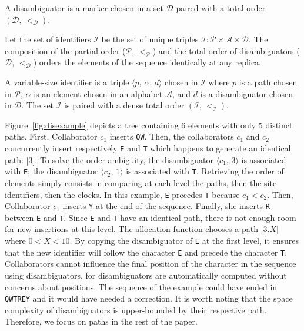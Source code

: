 \begin{definition}[Disambiguator]
  A disambiguator is a marker chosen in a set $\mathcal{D}$ paired with a total
  order $(\mathcal{D},\, <_\mathcal{D})$.
\end{definition}

Let the set of identifiers $\mathcal{I}$ be the set of unique triples
$\mathcal{I}:\mathcal{P}\times \mathcal{A}\times \mathcal{D}$. The composition
of the partial order ($\mathcal{P}$, $<_{\mathcal{P}}$) and the total order of
disambiguators ($\mathcal{D}$, $<_{\mathcal{D}}$) orders the elements of the
sequence identically at any replica.

\begin{definition}
  A variable-size identifier is a triple $\langle p,\, \alpha,\, d \rangle$
  chosen in $\mathcal{I}$ where $p$ is a path chosen in $\mathcal{P}$, $\alpha$
  is an element chosen in an alphabet $\mathcal{A}$, and $d$ is a disambiguator
  chosen in $\mathcal{D}$. The set $\mathcal{I}$ is paired with a dense total
  order $(\mathcal{I},\,<_\mathcal{I})$.
\end{definition}

Figure~\ref{fig:disexample} depicts a tree containing 6 elements with only 5
distinct paths. First, Collaborator $c_1$ inserts \texttt{QW}.  Then, the
collaborators $c_1$ and $c_2$ concurrently insert respectively \texttt{E} and
\texttt{T} which happens to generate an identical path: [$3$]. To solve the
order ambiguity, the disambiguator $\langle c_1,\, 3\rangle$ is associated with
\texttt{E}; the disambiguator $\langle c_2,\, 1\rangle$ is associated with
\texttt{T}. Retrieving the order of elements simply consists in comparing at
each level the paths, then the site identifiers, then the clocks. In this
example, \texttt{E} precedes \texttt{T} because $c_1 < c_2$. Then, Collaborator
$c_1$ inserts \texttt{Y} at the end of the sequence. Finally, she inserts
\texttt{R} between \texttt{E} and \texttt{T}. Since \texttt{E} and \texttt{T}
have an identical path, there is not enough room for new insertions at this
level. The allocation function chooses a path [$3.X$] where $0<X<10$. By copying
the disambiguator of \texttt{E} at the first level, it ensures that the new
identifier will follow the character \texttt{E} and precede the character
\texttt{T}.  Collaborators cannot influence the final position of the character
in the sequence using disambiguators, for disambiguators are automatically
computed without concerns about positions. The sequence of the example could
have ended in \texttt{QWTREY} and it would have needed a correction. It is worth
noting that the space complexity of disambiguators is upper-bounded by their
respective path. Therefore, we focus on paths in the rest of the paper.

